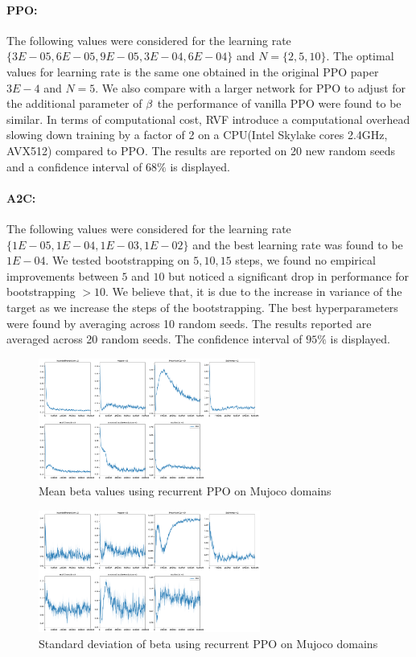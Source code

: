 \paragraph{PPO:} The following values were considered for the learning rate $\{3E-05,6E-05,9E-05,3E-04,6E-04\}$ and $N = \{2,5,10\}$.  The optimal values for learning rate is the same one obtained in the original PPO paper $3E-4$ and $N=5$.
We also compare with a larger network for PPO to adjust for the additional parameter of $\beta$ the performance of vanilla PPO were found to be similar. In terms of computational cost, RVF introduce a computational overhead slowing down training by a factor of 2 on a CPU(Intel Skylake cores 2.4GHz, AVX512) compared to PPO. The results are reported on 20 new random seeds and a confidence interval of $68\%$ is displayed. 
\paragraph{A2C:} The following values were considered for the learning rate $\{1E-05,1E-04,1E-03,1E-02\}$ and the best learning rate was found to be $1E-04$. We tested bootstrapping on $5,10,15$ steps, we found no empirical improvements between $5$ and $10$ but noticed a significant drop in performance for bootstrapping $>10$. We believe that, it is due to the increase in variance of the target as we increase the steps of the bootstrapping. The best hyperparameters were found by averaging across 10 random seeds. The results reported are averaged across 20 random seeds. The confidence interval of $95\%$ is displayed.
\begin{figure}[h]
    \centering
    \includegraphics[width=\textwidth, height=4cm]{fig/beta_mean.pdf}
    \caption{Mean beta values using recurrent PPO on Mujoco domains}
    \label{fig:beta_mean}
\end{figure}
\begin{figure}[h]
    \centering
    \includegraphics[width=\textwidth, height=4cm]{fig/beta_std.pdf}
    \caption{Standard deviation of beta using recurrent PPO on Mujoco domains}
    \label{fig:beta_std}
\end{figure}

